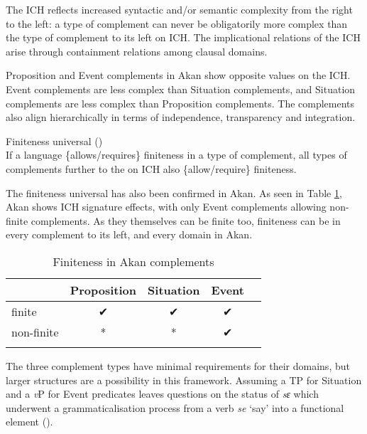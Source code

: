 \documentclass[output=paper]{langscibook}
\begin{document}
\begin{exe}
\ex \label{Paj27} \citet{wurmbrandlohninger2020}
\begin{xlist}
\ex \label{Paj27a}
The ICH reflects increased syntactic and/or semantic complexity from the right to the left: a type of complement can 	never be obligatorily more complex than the type of	complement to its left on ICH. 
\ex \label{Paj27b}
The implicational relations of the ICH arise through containment relations among clausal domains. 
\end{xlist}
\end{exe}


Proposition and Event complements in Akan show opposite values on the ICH. Event complements are less complex than Situation complements, and Situation complements are less complex than Proposition complements. The complements also align hierarchically in terms of independence, transparency and integration. 

\begin{exe} 
\ex \label{Paj28} Finiteness universal (\citealt{wurmbrandetal2020}) \\
If a language \{allows/requires\} finiteness in a type of complement, all types of complements further to the  on ICH also \{allow/require\} finiteness.

\end{exe}

The finiteness universal has also been confirmed in Akan. As seen in Table \ref{Pajtab6}, Akan shows ICH signature effects, with only Event complements allowing non-finite complements. As they themselves can be finite too, finiteness can be in every complement to its left, and every domain in Akan. 

\begin{table}
\caption{Finiteness in Akan complements}
\label{Pajtab6}
 \begin{tabular}{l cccc}
  \lsptoprule
            & Proposition & Situation  & Event \\
  \midrule
  finite  & ✔  & ✔    &   ✔    \\
  non-finite & *  & *  & ✔ \\ 
 
  \lspbottomrule
 \end{tabular}
\end{table}

The three complement types have minimal requirements for their domains, but larger structures are a possibility in this framework. Assuming a TP for Situation and a \emph{v}P for Event predicates leaves questions on the status of \emph{sɛ} which underwent a grammaticalisation process from a verb \emph{se} ‘say’ into a functional element (\citealt{osam1996}). 
\end{document}

